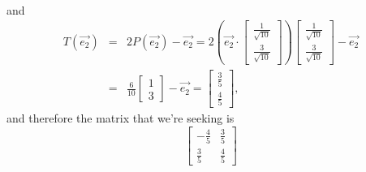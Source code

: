 \begin{SaveQuestion}
\begin{eqnarray*}
			\end{eqnarray*}
			and
			\begin{eqnarray*}
				T(\vec{e_2}) & = & 2P(\vec{e_2})-\vec{e_2}=2\left(\vec{e_2}\cdot\begin{bmatrix}\frac{1}{\sqrt{10}} \\ \frac{3}{\sqrt{10}}\end{bmatrix}\right)\begin{bmatrix}\frac{1}{\sqrt{10}} \\ \frac{3}{\sqrt{10}}\end{bmatrix}-\vec{e_2} \\
				& = & \frac{6}{10}\begin{bmatrix}1 \\ 3\end{bmatrix}-\vec{e_2}=\begin{bmatrix}\frac{3}{5} \\ \frac{4}{5}\end{bmatrix},
			\end{eqnarray*}
			and therefore the matrix that we're seeking is
			\begin{equation*}
				\begin{bmatrix}-\frac{4}{5} & \frac{3}{5} \\ \frac{3}{5} & \frac{4}{5}\end{bmatrix}
			\end{equation*}
\end{SaveQuestion}


